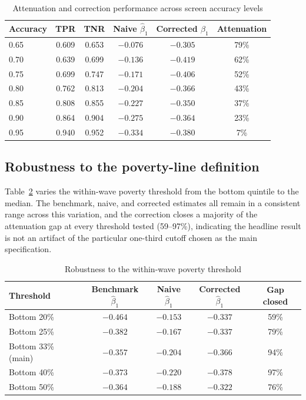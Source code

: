 \documentclass[12pt]{article}
\begin{document}
\begin{table}[htbp]
\centering
\caption{Attenuation and correction performance across screen accuracy levels}
\label{tab:accuracy}
\begin{tabular}{lccccc}
\toprule
Accuracy & TPR & TNR & Naive $\hat\beta_1$ & Corrected $\hat\beta_1$ & Attenuation \\
\midrule
0.65 & 0.609 & 0.653 & $-0.076$ & $-0.305$ & 79\% \\
0.70 & 0.639 & 0.699 & $-0.136$ & $-0.419$ & 62\% \\
0.75 & 0.699 & 0.747 & $-0.171$ & $-0.406$ & 52\% \\
0.80 & 0.762 & 0.813 & $-0.204$ & $-0.366$ & 43\% \\
0.85 & 0.808 & 0.855 & $-0.227$ & $-0.350$ & 37\% \\
0.90 & 0.864 & 0.904 & $-0.275$ & $-0.364$ & 23\% \\
0.95 & 0.940 & 0.952 & $-0.334$ & $-0.380$ & 7\% \\
\bottomrule
\end{tabular}
\end{table}

\subsection{Robustness to the poverty-line definition}

Table~\ref{tab:quantile} varies the within-wave poverty threshold from the bottom quintile to the median. The benchmark, naive, and corrected estimates all remain in a consistent range across this variation, and the correction closes a majority of the attenuation gap at every threshold tested (59--97\%), indicating the headline result is not an artifact of the particular one-third cutoff chosen as the main specification.

\begin{table}[htbp]
\centering
\caption{Robustness to the within-wave poverty threshold}
\label{tab:quantile}
\begin{tabular}{lcccc}
\toprule
Threshold & Benchmark $\hat\beta_1$ & Naive $\hat\beta_1$ & Corrected $\hat\beta_1$ & Gap closed \\
\midrule
Bottom 20\% & $-0.464$ & $-0.153$ & $-0.337$ & 59\% \\
Bottom 25\% & $-0.382$ & $-0.167$ & $-0.337$ & 79\% \\
Bottom 33\% (main) & $-0.357$ & $-0.204$ & $-0.366$ & 94\% \\
Bottom 40\% & $-0.373$ & $-0.220$ & $-0.378$ & 97\% \\
Bottom 50\% & $-0.364$ & $-0.188$ & $-0.322$ & 76\% \\
\bottomrule
\end{tabular}
\end{table}
\end{document}
